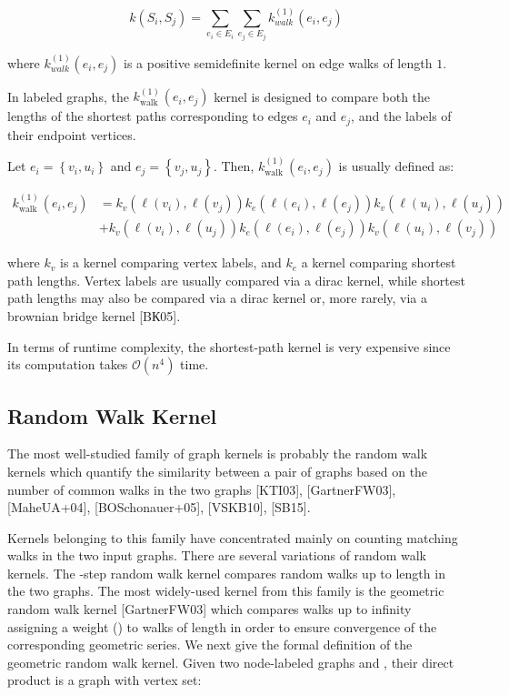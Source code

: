 $$
k\left(S_{i}, S_{j}\right)=\sum_{e_{i} \in E_{i}} \sum_{e_{j} \in E_{j}} k_{w a l k}^{(1)}\left(e_{i}, e_{j}\right)
$$

where $k_{w a l k}^{(1)}\left(e_{i}, e_{j}\right)$ is a positive semidefinite kernel on edge walks of length $1 .$

In labeled graphs, the $k_{\text {walk }}^{(1)}\left(e_{i}, e_{j}\right)$ kernel is designed to compare both the lengths of the shortest paths corresponding to edges $e_{i}$ and $e_{j}$, and the labels of their endpoint vertices.

Let $e_{i}=\left\{v_{i}, u_{i}\right\}$ and $e_{j}=\left\{v_{j}, u_{j}\right\}$. Then, $k_{\text {walk }}^{(1)}\left(e_{i}, e_{j}\right)$ is usually defined as:

$$
\begin{aligned}
k_{\text {walk }}^{(1)}\left(e_{i}, e_{j}\right) &=k_{v}\left(\ell\left(v_{i}\right), \ell\left(v_{j}\right)\right) k_{e}\left(\ell\left(e_{i}\right), \ell\left(e_{j}\right)\right) k_{v}\left(\ell\left(u_{i}\right), \ell\left(u_{j}\right)\right) \\
&+k_{v}\left(\ell\left(v_{i}\right), \ell\left(u_{j}\right)\right) k_{e}\left(\ell\left(e_{i}\right), \ell\left(e_{j}\right)\right) k_{v}\left(\ell\left(u_{i}\right), \ell\left(v_{j}\right)\right)
\end{aligned}
$$

where $k_{v}$ is a kernel comparing vertex labels, and $k_{e}$ a kernel comparing shortest path lengths. Vertex labels are usually compared via a dirac kernel, while shortest path lengths may also be compared via a dirac kernel or, more rarely, via a brownian bridge kernel [BК05].

In terms of runtime complexity, the shortest-path kernel is very expensive since its computation takes $\mathcal{O}\left(n^{4}\right)$ time.

\subsection{Random Walk Kernel}
The most well-studied family of graph kernels is probably the random walk kernels which quantify the similarity between a pair of graphs based on the number of common walks in the two graphs [KTI03], [GartnerFW03], [MaheUA+04], [BOSchonauer+05], [VSKB10], [SB15].

Kernels belonging to this family have concentrated mainly on counting matching walks in the two input graphs. There are several variations of random walk kernels. The -step random walk kernel compares random walks up to length  in the two graphs. The most widely-used kernel from this family is the geometric random walk kernel [GartnerFW03] which compares walks up to infinity assigning a weight  () to walks of length  in order to ensure convergence of the corresponding geometric series. We next give the formal definition of the geometric random walk kernel. Given two node-labeled graphs  and  , their direct product is a graph with vertex set:

